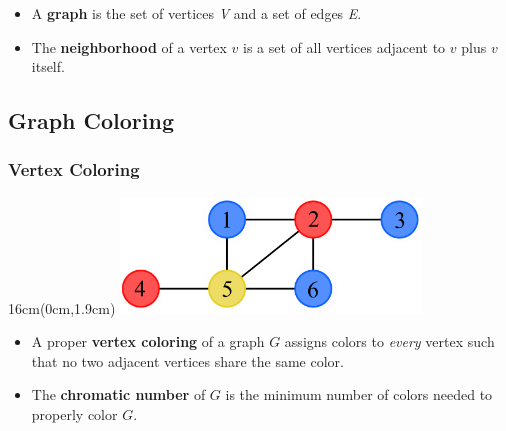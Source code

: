 \documentclass[xcolor=dvipsnames,aspectratio=1610]{beamer}
\newcommand{\exampleheight}{1.9cm}
\newcommand{\examplewidth}{16cm}
\begin{document}
\begin{frame}
    \vspace{4cm}

    \vfill

    \begin{itemize}
      \item<1-4> A \textbf{graph} is the set of vertices \emph{V} and a set of edges \emph{E}.
      \item<2-4> The \textbf{neighborhood} of a vertex $v$ is a set of all vertices adjacent to $v$ plus $v$ itself.
    \end{itemize}

  \end{frame}

  \subsection{Graph Coloring}

  \begin{frame}
    \frametitle{Vertex Coloring}

    \begin{textblock*}{\examplewidth}(0cm,\exampleheight) %
      \centering
      \includegraphics[width=8cm]{../figures/example-vcp.pdf}
    \end{textblock*}

    \vspace{4cm}
    \vfill


    \begin{itemize}
      \item A proper \textbf{vertex coloring} of a graph $G$ assigns colors to \emph{every} vertex such that no two adjacent vertices share the same color.
      \item The \textbf{chromatic number} of $G$ is the minimum number of colors needed to properly color $G$.
    \end{itemize}
  \end{frame}
\end{document}

